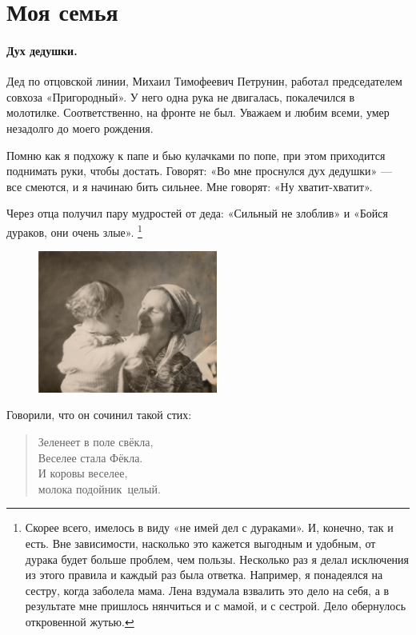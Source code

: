 \documentclass{book}
\begin{document}
\section*{Моя семья}

\paragraph{Дух дедушки.}
Дед по отцовской линии, Михаил Тимофеевич Петрунин, работал председателем совхоза «Пригородный».
У него одна рука не двигалась, покалечился в молотилке.
Соответственно, на фронте не был. 
Уважаем и любим всеми, умер незадолго до моего рождения.

Помню как я подхожу к папе и бью кулачками по попе,
при этом приходится поднимать руки, чтобы достать.
Говорят: «Во мне проснулся дух дедушки» --- все смеются, и я начинаю бить сильнее.
Мне говорят: «Ну хватит-хватит».

Через отца получил пару мудростей от деда: «Сильный не злоблив» и «Бойся дураков, они очень злые».%
\footnote{Скорее всего, имелось в виду «не имей дел с дураками». 
И, конечно, так и есть.
Вне зависимости, насколько это кажется выгодным и удобным, от дурака будет больше проблем, чем пользы.
Несколько раз я делал исключения из этого правила и каждый раз была ответка.
Например, я понадеялся на сестру, когда заболела мама.
Лена вздумала взвалить это дело на себя, а в результате мне пришлось нянчиться и с мамой, и с сестрой.
Дело обернулось откровенной жутью.}

\begin{figure}
\vskip-4mm
\centering
\includegraphics[width=59mm,angle=0]{pics/lena-baba-zina}
\vskip-12mm
\end{figure}

Говорили, что он сочинил такой стих:
\begin{verse}
Зеленеет в поле \mbox{свёкла},
\\
\quad Веселее стала \mbox{Фёкла.}
\\
И коровы веселее,
\\
\quad молока \mbox{подойник целый.}
\end{verse}
\end{document}
